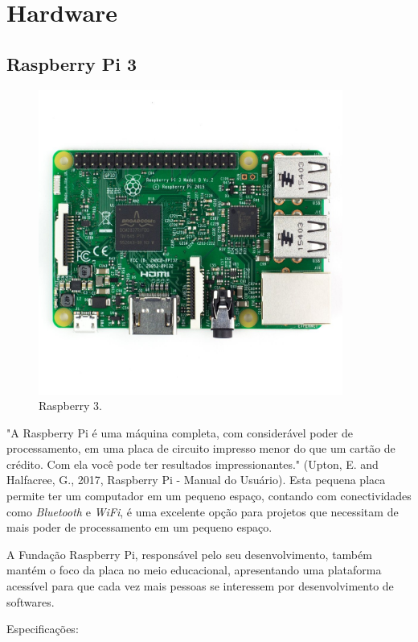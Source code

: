 \documentclass[
	12pt,				%
	oneside,			%
	a4paper,			%
	brazil				%
]{abntex2}
\begin{document}
{\newpage

\section{Hardware}

\subsection{Raspberry Pi 3}

\begin{figure}[!h]
\centering
\includegraphics[width=10cm, center]{images/raspberry-pi}
\caption{Raspberry 3.}
\label{Rotulo}
\end{figure}

"A Raspberry Pi é uma máquina completa, com considerável poder de processamento, em uma placa de circuito impresso menor do que um cartão de crédito. Com ela você pode ter resultados impressionantes." (Upton, E. and Halfacree, G., 2017, Raspberry Pi - Manual do Usuário). Esta pequena placa permite ter um computador em um pequeno espaço, contando com conectividades como \textit{Bluetooth} e \textit{WiFi}, é uma excelente opção para projetos que necessitam de mais poder de processamento em um pequeno espaço. 

A Fundação Raspberry Pi, responsável pelo seu desenvolvimento, também mantém o foco da placa no meio educacional, apresentando uma plataforma acessível para que cada vez mais pessoas se interessem por desenvolvimento de softwares.

Especificações:

}
\end{document}
